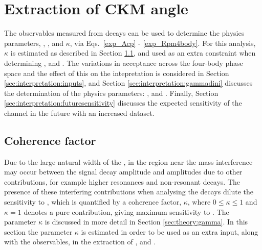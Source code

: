 \clearpage
%

\chapter{\label{ch:6-interpretation}Extraction of CKM angle \Pgamma} 

\minitoc

The \CP observables measured from \btodkst decays can be used to determine the physics parameters, \rb, \deltab, \Pgamma and $\kappa$, via Eqs.~\ref{exp_Acp} - \ref{exp_Rpm4body}. For this analysis, $\kappa$ is estimated as described in Section \ref{sec:interpretation:coherence}, and used as an extra constraint when determining \rb, \deltab and \Pgamma. The variations in acceptance across the four-body phase space and the effect of this on the intepretation is considered in Section \ref{sec:interpretation:inputs}, and Section \ref{sec:interpretation:gammadini} discusses the determination of the physics parameters: \rb, \deltab and \Pgamma. Finally, Section \ref{sec:interpretation:futuresensitivity} discusses the expected sensitivity of the \btodkst channel in the future with an increased dataset.

\section{Coherence factor}
\label{sec:interpretation:coherence}

Due to the large natural width of the \Kstarm, in the region near the \Kstarm mass interference may occur between the signal \Kstarm decay amplitude and amplitudes due to other \decay{\Bm}{\D\KS\pim} contributions, for example higher \KS\pim resonances and non-resonant decays. The presence of these interfering contributions when analysing the \btodkst decays dilute the sensitivity to \Pgamma, which is quantified by a coherence factor, $\kappa$, where $0 \leq \kappa \leq 1$ and $\kappa = 1$ denotes a pure \Kstarm contribution, giving maximum sensitivity to \Pgamma. The parameter $\kappa$ is discussed in more detail in Section \ref{sec:theory:gamma}. In this section the parameter $\kappa$ is estimated in order to be used as an extra input, along with the \CP observables, in the extraction of \rb, \deltab and \Pgamma.

